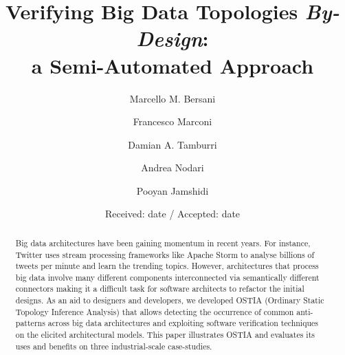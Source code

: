 \documentclass[smallextended]{svjour3}       %
\begin{document}
\title{Verifying Big Data Topologies \emph{By-Design}:\\ a Semi-Automated Approach}


\author{Marcello M. Bersani \and Francesco Marconi \and Damian A. Tamburri \and Andrea Nodari \and Pooyan Jamshidi}



\date{Received: date / Accepted: date}


\maketitle

\begin{abstract}
Big data architectures have been gaining momentum in recent years. For
instance, Twitter uses stream processing frameworks like Apache Storm to analyse billions of tweets per minute and learn the trending topics. However, architectures that process big data involve many different components interconnected via semantically different connectors making it a difficult task for software architects to refactor the initial designs. As an aid to designers and developers, we developed OSTIA (Ordinary Static Topology Inference Analysis) that allows detecting the occurrence of common anti-patterns across big data architectures and exploiting software verification techniques on the elicited architectural models. This paper illustrates OSTIA and evaluates its uses and benefits on three industrial-scale case-studies.
\end{abstract}
\end{document}
